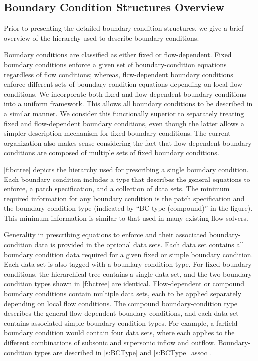 \subsection{Boundary Condition Structures Overview}
\label{s:BCstruct}

Prior to presenting the detailed boundary condition structures, we give
a brief overview of the hierarchy used to describe boundary conditions.

Boundary conditions are classified as either fixed or flow-dependent.
Fixed boundary conditions enforce a given set of boundary-condition
equations regardless of flow conditions; whereas, flow-dependent
boundary conditions enforce different sets of boundary-condition
equations depending on local flow conditions.  We incorporate both
fixed and flow-dependent boundary conditions into a uniform framework.
This allows all boundary conditions to be described in a similar
manner.  We consider this functionally superior to separately treating
fixed and flow-dependent boundary conditions, even though the latter
allows a simpler description mechanism for fixed boundary conditions.
The current organization also makes sense considering the fact that
flow-dependent boundary conditions are composed of multiple sets of
fixed boundary conditions.



\autoref{f:bctree} depicts the hierarchy used for prescribing a single
boundary condition.
Each boundary condition includes a type that describes the general
equations to enforce, a patch specification, and a collection of data
sets.
The minimum required information for any boundary condition is the patch
specification and the boundary-condition type (indicated by ``BC type
(compound)'' in the figure).
This minimum information is similar to that used in many existing
flow solvers.

Generality in prescribing equations to enforce and their associated
boundary-condition data is provided in the optional data sets.  Each
data set contains all boundary condition data required for a given
fixed or simple boundary condition.  Each data set is also tagged
with a boundary-condition type.  For fixed boundary conditions,
the hierarchical tree contains a single data set, and the two
boundary-condition types shown in \autoref{f:bctree} are identical.
Flow-dependent or compound boundary conditions contain multiple
data sets, each to be applied separately depending on local flow
conditions.  The compound boundary-condition type describes the
general flow-dependent boundary conditions, and each data set contains
associated simple boundary-condition types.  For example, a farfield
boundary condition would contain four data sets, where each applies
to the different combinations of subsonic and supersonic inflow and
outflow.  Boundary-condition types are described in \autoref{s:BCType}
and \autoref{s:BCType_assoc}.

